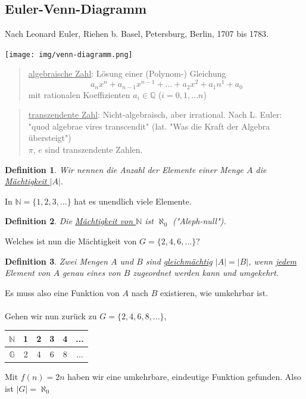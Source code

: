 \documentclass{report}
\newtheorem{mydef}{Definition}
\begin{document}
\subsection{Euler-Venn-Diagramm}
Nach Leonard Euler, Riehen b. Basel, Petersburg, Berlin, 1707 bis 1783.
\begin{center}\texttt{[image: img/venn-diagramm.png]}\end{center}
\begin{quote}\underline{algebraische Zahl}: Lösung einer (Polynom-) Gleichung \begin{equation}
a_nx^n + a_{n-1}x^{n-1} + ... + a_2x^2 + a_1n^1 + a_0\end{equation}
mit rationalen Koeffizienten $a_i \in \mathbb{Q}$ ($i = 0,1,...n$)\end{quote}
\begin{quote}\underline{transzendente Zahl}: Nicht-algebraisch, aber irrational. Nach L. Euler: "quod algebrae vires transcendit" (lat. "Was die Kraft der Algebra übersteigt")\\
$\pi$, $e$ sind transzendente Zahlen.\end{quote}
\begin{mydef}Wir nennen die Anzahl der Elemente einer Menge $A$ die \underline{Mächtigkeit $|A|$}. \end{mydef}
In $\mathbb{N} = \{1, 2, 3, ... \}$ hat es unendlich viele Elemente.
\begin{mydef} Die \underline{Mächtigkeit von $\mathbb{N}$} ist $\aleph_0$ ("Aleph-null").\end{mydef}
Welches ist nun die Mächtigkeit von $G = \{2, 4, 6, ...\}$?
\begin{mydef}Zwei Mengen $A$ und $B$ sind \underline{gleichmächtig} $|A| = |B|$, wenn \underline{jedem} Element von $A$ genau eines von $B$ zugeordnet werden kann und umgekehrt.\end{mydef}
Es muss also eine Funktion von $A$ nach $B$ existieren, wie umkehrbar ist.
\\\\
Gehen wir nun zurück zu $G = \{2, 4, 6, 8, ...\}$,
\begin{center}\begin{tabular}{c | c | c | c | c | c}$\mathbb{N}$ & 1 & 2 & 3 & 4 & ...\\ \hline
$\mathbb{G}$ & 2 & 4 & 6 & 8 & ...\end{tabular}\end{center}
Mit $f(n) = 2n$ haben wir eine umkehrbare, eindeutige Funktion gefunden. Also ist $|G| = \aleph_0$\\
\end{document}
